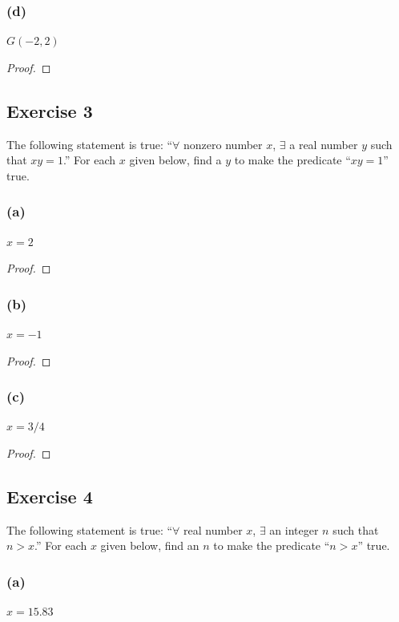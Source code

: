 \documentclass[14pt]{extarticle}
\newcommand{\fa}{\forall}
\newcommand{\te}{\exists}
\begin{document}
\subsubsection{(d)}
$G(-2, 2)$

\begin{proof}

\end{proof}

\subsection{Exercise 3}
The following statement is true: “$\fa$ nonzero number $x$, $\te$ a real number $y$ such that $xy = 1$.” For each $x$ given below, find a $y$ to make the predicate “$xy = 1$” true.

\subsubsection{(a)}
$x = 2$

\begin{proof}

\end{proof}

\subsubsection{(b)}
$x = -1$

\begin{proof}

\end{proof}

\subsubsection{(c)}
$x = 3/4$

\begin{proof}

\end{proof}

\subsection{Exercise 4}
The following statement is true: “$\fa$ real number $x$, $\te$ an integer $n$ such that $n > x$.” For each $x$ given below, find an $n$ to make the predicate “$n > x$” true.

\subsubsection{(a)}
$x = 15.83$
\end{document}
